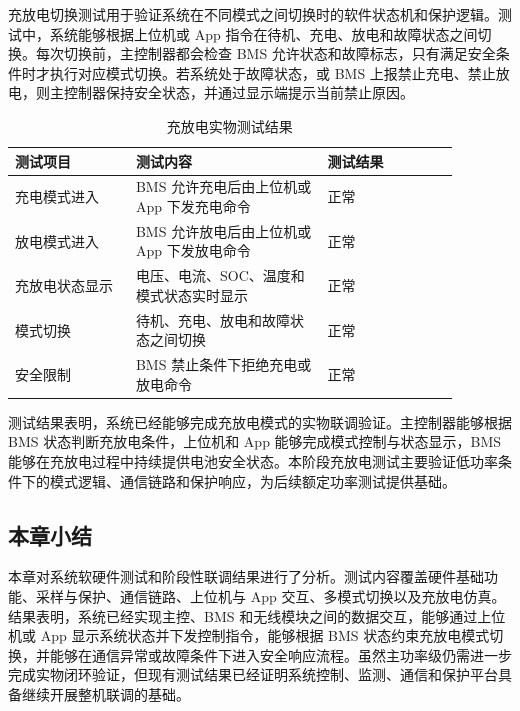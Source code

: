 充放电切换测试用于验证系统在不同模式之间切换时的软件状态机和保护逻辑。测试中，系统能够根据上位机或 App 指令在待机、充电、放电和故障状态之间切换。每次切换前，主控制器都会检查 BMS 允许状态和故障标志，只有满足安全条件时才执行对应模式切换。若系统处于故障状态，或 BMS 上报禁止充电、禁止放电，则主控制器保持安全状态，并通过显示端提示当前禁止原因。

\begin{table}[htbp]
  \centering
  \caption{充放电实物测试结果}
  \label{tab:charge_discharge_test}
  \renewcommand{\arraystretch}{1.2}
  \begin{tabular}{|m{0.24\linewidth}|m{0.38\linewidth}|m{0.26\linewidth}|}
    \hline
    \rule{0pt}{1.0cm}测试项目 & 测试内容 & 测试结果 \\
    \hline
    \rule{0pt}{1.0cm}充电模式进入 & BMS 允许充电后由上位机或 App 下发充电命令 & 正常 \\
    \hline
    \rule{0pt}{1.0cm}放电模式进入 & BMS 允许放电后由上位机或 App 下发放电命令 & 正常 \\
    \hline
    \rule{0pt}{1.0cm}充放电状态显示 & 电压、电流、SOC、温度和模式状态实时显示 & 正常 \\
    \hline
    \rule{0pt}{1.0cm}模式切换 & 待机、充电、放电和故障状态之间切换 & 正常 \\
    \hline
    \rule{0pt}{1.0cm}安全限制 & BMS 禁止条件下拒绝充电或放电命令 & 正常 \\
    \hline
  \end{tabular}
\end{table}

测试结果表明，系统已经能够完成充放电模式的实物联调验证。主控制器能够根据 BMS 状态判断充放电条件，上位机和 App 能够完成模式控制与状态显示，BMS 能够在充放电过程中持续提供电池安全状态。本阶段充放电测试主要验证低功率条件下的模式逻辑、通信链路和保护响应，为后续额定功率测试提供基础。

\subsection{本章小结}

本章对系统软硬件测试和阶段性联调结果进行了分析。测试内容覆盖硬件基础功能、采样与保护、通信链路、上位机与 App 交互、多模式切换以及充放电仿真。结果表明，系统已经实现主控、BMS 和无线模块之间的数据交互，能够通过上位机或 App 显示系统状态并下发控制指令，能够根据 BMS 状态约束充放电模式切换，并能够在通信异常或故障条件下进入安全响应流程。虽然主功率级仍需进一步完成实物闭环验证，但现有测试结果已经证明系统控制、监测、通信和保护平台具备继续开展整机联调的基础。